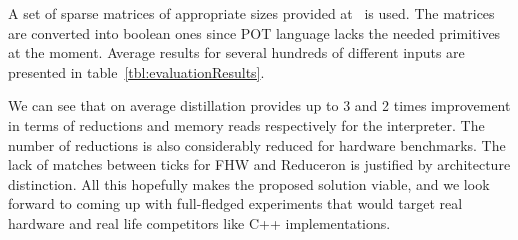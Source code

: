 A set of sparse matrices of appropriate sizes provided at~\cite{Matrices} is used. 
The matrices are converted into boolean ones since POT language lacks the needed primitives at the moment.
Average results for several hundreds of different inputs are presented in table~\ref{tbl:evaluationResults}.

We can see that on average distillation provides up to 3 and 2 times improvement in terms of reductions and memory reads respectively for the interpreter. 
The number of reductions is also considerably reduced for hardware benchmarks. 
The lack of matches between ticks for FHW and Reduceron is justified by architecture distinction. 
All this hopefully makes the proposed solution viable, and we look forward to coming up with full-fledged experiments that would target real hardware and real life competitors like C++ implementations.
